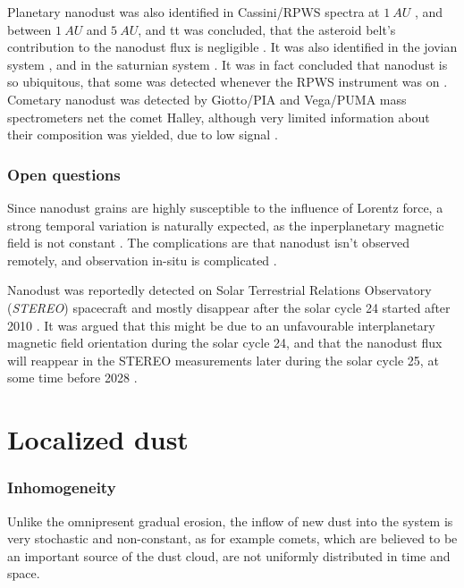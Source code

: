 Planetary nanodust was also identified in Cassini/RPWS spectra 
at $\SI{1}{AU}$ \citep{schippers2014nanodust}, and  between $\SI{1}{AU}$ and $\SI{5}{AU}$, and tt was concluded, that the asteroid belt's contribution to the nanodust flux is negligible \citep{schippers2015nanodust}. It was also identified in the jovian system \citep{meyer2009detecting}, and in the saturnian system \citep{kempf2005high}. It was in fact concluded that nanodust is so ubiquitous, that some was detected whenever the RPWS instrument was on \citep{schippers2015nanodust}. Cometary nanodust was detected by Giotto/PIA and Vega/PUMA mass spectrometers net the comet Halley, although very limited information about their composition was yielded, due to low signal \cite{utterback1990attogram}.

\subsubsection{Open questions}

Since nanodust grains are highly susceptible to the influence of Lorentz force, a strong temporal variation is naturally expected, as the inperplanetary magnetic field is not constant \citep{poppe2020effects}. The complications are that nanodust isn't observed remotely, and observation in-situ is complicated \citep{pantellini2012nano,kellogg2016dust,kellogg2017note}. 

Nanodust was reportedly detected on Solar Terrestrial Relations Observatory (\textit{STEREO}) spacecraft \citep{meyer2009dust} and mostly disappear after the solar cycle 24 started after 2010 \citep{zaslavsky2012interplanetary}. It was argued that this might be due to an unfavourable interplanetary magnetic field orientation during the solar cycle 24, and that the nanodust flux will reappear in the STEREO measurements later during the solar cycle 25, at some time before 2028 \citep{poppe2022effects}.

\section{Localized dust}

\subsubsection{Inhomogeneity}

Unlike the omnipresent gradual erosion, the inflow of new dust into the system is very stochastic and non-constant, as for example comets, which are believed to be an important source of the dust cloud, are not uniformly distributed in time and space.

